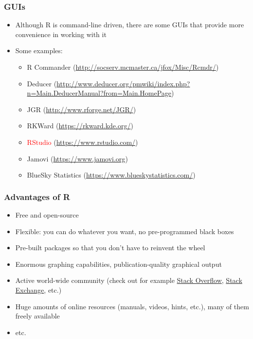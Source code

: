 \documentclass[10pt]{beamer}
\theoremstyle{definition}
\begin{document}
\begin{frame}[fragile]
\frametitle{GUIs}
\begin{itemize}
	\item Although R is command-line driven, there are some GUIs that provide more convenience in working with it
	
	\item Some examples:
	\begin{itemize}
		\item R Commander (\url{http://socserv.mcmaster.ca/jfox/Misc/Rcmdr/})

		\item Deducer (\url{http://www.deducer.org/pmwiki/index.php?n=Main.DeducerManual?from=Main.HomePage})

		\item JGR (\url{http://www.rforge.net/JGR/})
		
		\item RKWard (\url{https://rkward.kde.org/})
		
		\item \textcolor{red}{RStudio} (\url{https://www.rstudio.com/})
		
		\item Jamovi (\url{https://www.jamovi.org})
		
		\item BlueSky Statistics (\url{https://www.blueskystatistics.com/})
	\end{itemize}
\end{itemize}
\end{frame}

\begin{frame}[fragile]
\frametitle{Advantages of R}
\begin{itemize}
	\item Free and open-source

	\item Flexible: you can do whatever you want, no pre-programmed black boxes
	
	\item Pre-built packages so that you don't have to reinvent the wheel
	
	\item Enormous graphing capabilities, publication-quality graphical output
	
	\item Active world-wide community (check out for example \href{https://stackoverflow.com/}{Stack Overflow}, \href{https://stackexchange.com/}{Stack Exchange}, etc.)
	
	\item Huge amounts of online resources (manuals, videos, hints, etc.), many of them freely available

	\item etc.
\end{itemize}
\end{frame}
\end{document}
